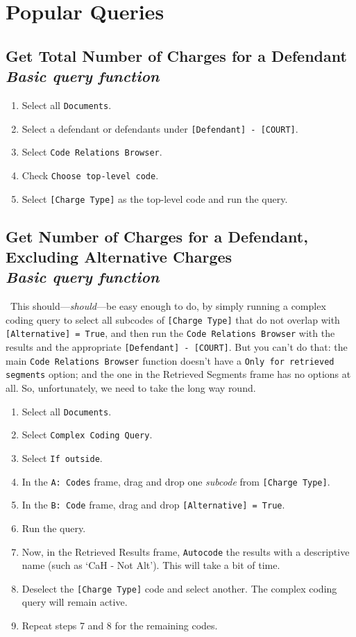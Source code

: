 \documentclass[usenames,dvipsnames]{article}
\newcommand{\code}[1]{\colorbox{light-gray}{\texttt{#1}}}
\newcommand{\command}[1]{\colorbox{light-red}{\texttt{#1}}}
\newcommand{\option}[1]{\colorbox{light-blue}{\texttt{#1}}}
\newcommand{\chargingdocs}[1]{\colorbox{light-yellow}{\texttt{#1}}}
\newcommand{\note}[1]{\textit{\textbf{Note:} }}
\begin{document}
\section{Popular Queries}
\subsection{Get Total Number of Charges for a Defendant \\ \textit{Basic query function}}
\begin{enumerate}
	\item Select all \chargingdocs{Documents}.
	\item Select a defendant or defendants under \code{[Defendant] - [COURT]}.
	\item Select \command{Code Relations Browser}.
	\item Check \option{Choose top-level code}.
	\item Select \code{[Charge Type]} as the top-level code and run the query.
\end{enumerate}

\subsection{Get Number of Charges for a Defendant, Excluding Alternative Charges \\ \textit{Basic query function}}
\note ~This should---\textit{should}---be easy enough to do, by simply running a complex coding query to select all subcodes of \code{[Charge Type]} that do not overlap with \code{[Alternative] = True}, and then run the \command{Code Relations Browser} with the results and the appropriate \code{[Defendant] - [COURT]}. But you can't do that: the main \command{Code Relations Browser} function doesn't have a \option{Only for retrieved segments} option; and the one in the Retrieved Segments frame has no options at all. So, unfortunately, we need to take the long way round.
\begin{enumerate}
	\item Select all \chargingdocs{Documents}.
	\item Select \command{Complex Coding Query}.
	\item Select \option{If outside}.
	\item In the \option{A: Codes} frame, drag and drop one \textit{subcode} from \code{[Charge Type]}.
	\item In the \option{B: Code} frame, drag and drop \code{[Alternative] = True}.
	\item Run the query.
	\item Now, in the Retrieved Results frame, \command{Autocode} the results with a descriptive name (such as `CaH - Not Alt'). This will take a bit of time.
	\item Deselect the \code{[Charge Type]} code and select another. The complex coding query will remain active.
	\item Repeat steps 7 and 8 for the remaining codes.
\end{enumerate}
\end{document}
